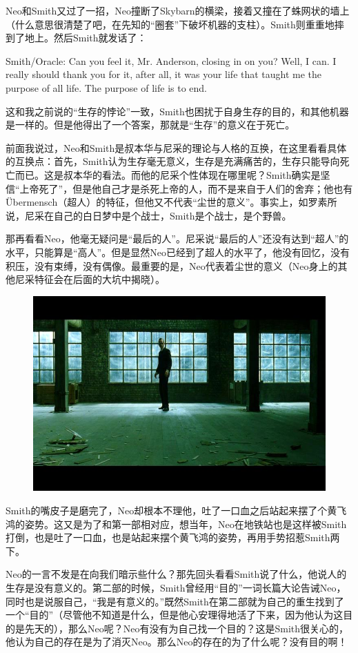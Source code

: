 \documentclass[UTF8]{ctexart}
\newenvironment{myquote}{\color{green} \setlength{\leftskip}{6em} \setlength{\rightskip}{4em} \setlength{\parindent}{-2em}}{\par}
\begin{document}
Neo和Smith又过了一招，Neo撞断了Skybarn的横梁，接着又撞在了蛛网状的墙上（什么意思很清楚了吧，在先知的“圈套”下破坏机器的支柱）。Smith则重重地摔到了地上。然后Smith就发话了：

\begin{myquote}
Smith/Oracle: Can you feel it, Mr. Anderson, closing in on you? Well, I can. I really should thank you for it, after all, it was your life that taught me the purpose of all life. The purpose of life is to end.
\end{myquote}

这和我之前说的“生存的悖论”一致，Smith也困扰于自身生存的目的，和其他机器是一样的。但是他得出了一个答案，那就是“生存”的意义在于死亡。

前面我说过，Neo和Smith是叔本华与尼采的理论与人格的互换，在这里看看具体的互换点：首先，Smith认为生存毫无意义，生存是充满痛苦的，生存只能导向死亡而已。这是叔本华的看法。而他的尼采个性体现在哪里呢？Smith确实是坚信“上帝死了”，但是他自己才是杀死上帝的人，而不是来自于人们的舍弃；他也有Übermensch（超人）的特征，但他又不代表“尘世的意义”。事实上，如罗素所说，尼采在自己的白日梦中是个战士，Smith是个战士，是个野兽。

那再看看Neo，他毫无疑问是“最后的人”。尼采说“最后的人”还没有达到“超人”的水平，只能算是“高人”。但是显然Neo已经到了超人的水平了，他没有回忆，没有积压，没有束缚，没有偶像。最重要的是，Neo代表着尘世的意义（Neo身上的其他尼采特征会在后面的大坑中揭晓）。

\begin{figure}[htb]
\centering
\includegraphics[width=0.5\linewidth]{fig/63466a602ff51d46eaf8f84f.jpg}
\end{figure}

Smith的嘴皮子是磨完了，Neo却根本不理他，吐了一口血之后站起来摆了个黄飞鸿的姿势。这又是为了和第一部相对应，想当年，Neo在地铁站也是这样被Smith打倒，也是吐了一口血，也是站起来摆个黄飞鸿的姿势，再用手势招惹Smith两下。

Neo的一言不发是在向我们暗示些什么？那先回头看看Smith说了什么，他说人的生存是没有意义的。第二部的时候，Smith曾经用“目的”一词长篇大论告诫Neo，同时也是说服自己，“我是有意义的。”既然Smith在第二部就为自己的重生找到了一个“目的”（尽管他不知道是什么，但是他心安理得地活了下来，因为他认为这目的是先天的），那么Neo呢？Neo有没有为自己找一个目的？这是Smith很关心的，他认为自己的存在是为了消灭Neo。那么Neo的存在的为了什么呢？没有目的啊！
\end{document}
